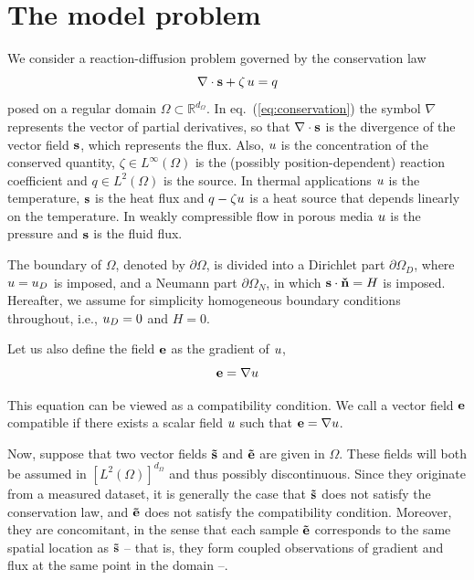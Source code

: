 \section{The model problem}

We consider a reaction-diffusion problem governed by the conservation law
\begin{equation}
	\nabla \cdot \mathbf{s} + \zeta\,u = q
	\label{eq:conservation}
\end{equation}
posed on a regular domain $\Omega \subset \mathbb{R}^{d_{\Omega}}$. In eq.~(\ref{eq:conservation}) the symbol $\nabla$ represents the vector of partial derivatives, so that $\nabla \cdot \mathbf{s}$ is the divergence of the vector field $\mathbf{s}$, which represents the flux. Also, $u$ is the concentration of the conserved quantity, $\zeta \in L^{\infty}(\Omega)$ is the (possibly position-dependent) reaction coefficient and $q\in L^2(\Omega)$ is the source. In thermal applications $u$ is the temperature, $\mathbf{s}$ is the heat flux and $q-\zeta u$ is a heat source that depends linearly on the temperature. In weakly compressible flow in porous media $u$ is the pressure and $\mathbf{s}$ is the fluid flux.

The boundary of $\Omega$, denoted by $\partial \Omega$, is divided into a Dirichlet part $\partial \Omega_D$, where $u=u_D$ is imposed, and a Neumann part $\partial\Omega_N$, in which $\mathbf{s} \cdot \mathbf{\check{n}}=H$ is imposed. Hereafter, we assume for simplicity homogeneous boundary conditions throughout, i.e., $u_D = 0$ and $H = 0$.

Let us also define the field $\mathbf{e}$ as the gradient of $u$,
\begin{equation}
	\mathbf{e} = \nabla u
\label{eq:compatibility}
\end{equation}

This equation can be viewed as a compatibility condition. We call a vector field $\mathbf{e}$ compatible if there exists a scalar field $u$ such that $\mathbf{e}=\nabla u$.

Now, suppose that two vector fields $\mathbf{\tilde{s}}$ and $\mathbf{\tilde{e}}$ are given in $\Omega$. These fields will both be assumed in $\left[L^2(\Omega)\right]^{d_{\Omega}}$ and thus possibly discontinuous. Since they originate from a measured dataset, it is generally the case that $\mathbf{\tilde{s}}$ does not satisfy the conservation law, and $\mathbf{\tilde{e}}$ does not satisfy the compatibility condition. Moreover, they are concomitant, in the sense that each sample $\mathbf{\tilde{e}}$ corresponds to the same spatial location as $\mathbf{\tilde{s}}$ -- that is, they form coupled observations of gradient and flux at the same point in the domain --.

